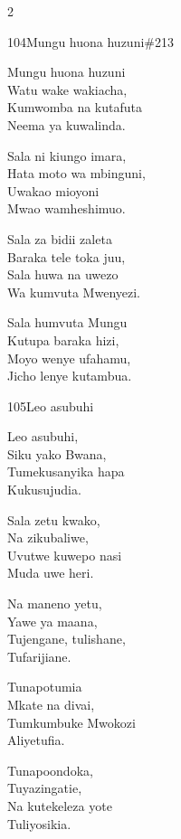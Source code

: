 \documentclass{article}
\begin{document}
\begin{multicols}{2}
\begin{hymn}{104}{Mungu huona huzuni}{\#213}
\begin{stanza}
Mungu huona huzuni\\
Watu wake wakiacha,\\
Kumwomba na kutafuta\\
Neema ya kuwalinda.
\end{stanza}
\begin{stanza}
Sala ni kiungo imara,\\
Hata moto wa mbinguni,\\
Uwakao mioyoni\\
Mwao wamheshimuo.
\end{stanza}
\begin{stanza}
Sala za bidii zaleta\\
Baraka tele toka juu,\\
Sala huwa na uwezo\\
Wa kumvuta Mwenyezi.
\end{stanza}
\begin{stanza}
Sala humvuta Mungu\\
Kutupa baraka hizi,\\
Moyo wenye ufahamu,\\
Jicho lenye kutambua.
\end{stanza}
\end{hymn}

\begin{hymn}{105}{Leo asubuhi}{}
\begin{stanza}
Leo asubuhi,\\
Siku yako Bwana,\\
Tumekusanyika hapa\\
Kukusujudia.
\end{stanza}
\begin{stanza}
Sala zetu kwako,\\
Na zikubaliwe,\\
Uvutwe kuwepo nasi\\
Muda uwe heri.
\end{stanza}
\begin{stanza}
Na maneno yetu,\\
Yawe ya maana,\\
Tujengane, tulishane,\\
Tufarijiane.
\end{stanza}
\begin{stanza}
Tunapotumia\\
Mkate na divai,\\
Tumkumbuke Mwokozi\\
Aliyetufia.
\end{stanza}
\begin{stanza}
Tunapoondoka,\\
Tuyazingatie,\\
Na kutekeleza yote\\
Tuliyosikia.
\end{stanza}
\end{hymn}


\end{multicols}
\end{document}
